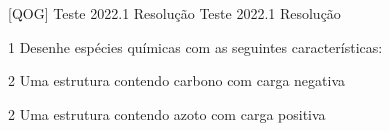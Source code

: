 \documentclass[\mainfilename]{subfiles}
\begin{document}

[QOG]
{Teste 2022.1 Resolução} %
{Teste 2022.1 Resolução} %

\begin{questionBox}1{ %
    Desenhe espécies químicas com as seguintes características:
} %
    \begin{multicols}{2}
        
        \begin{questionBox}2{ %
            Uma estrutura contendo carbono com carga negativa
        } %
            \begin{center}
            \end{center}
        \end{questionBox}

        \begin{questionBox}2{ %
            Uma estrutura contendo azoto com carga positiva
        } %
            \begin{center}
            \end{center}
        \end{questionBox}
        
    \end{multicols}


\end{questionBox}
\end{document}
